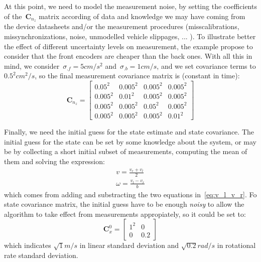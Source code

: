 At this point, we need to model the measurement noise, by setting the coefficients of the~$\mathbf{C}_{n_z}$ matrix according of data and knowledge we may have coming from the device datasheets and/or the measurement procedures (misscalibrations, missynchronizations, noise, unmodelled vehicle slippages, ... ). To illustrate better the effect of different uncertainty levels on measurement, the example propose to consider that the front encoders are cheaper than the back ones. With all this in mind, we consider~$\sigma_{.f}=5cm/s^2$ and~$\sigma_{.b}=1cm/s$, and we set covariance terms to $0.5^2 cm^2/s$, so the final measurement covariance matrix is (constant in time):
\begin{equation}
 \mathbf{C}_{n_z} = 
 \left[
 \begin{array}{cccc}
  0.05^2 & 0.005^2 & 0.005^2 & 0.005^2 \\
  0.005^2& 0.01^2  & 0.005^2 & 0.005^2 \\
  0.005^2& 0.005^2 & 0.05^2  & 0.005^2 \\
  0.005^2& 0.005^2 & 0.005^2 & 0.01^2
 \end{array}
 \right]
\end{equation}

Finally, we need the initial guess for the state estimate and state covariance. The initial guess for the state can be set by some knowledge about the system, or may be by collecting a short initial subset of measurements, computing the mean of them and solving the expression:
\begin{equation}
\begin{array}{cc}
 v = \frac{v_r+v_l}{2} \\
 \omega = \frac{v_l-v_r}{b}
\end{array}
\end{equation}
which comes from adding and substracting the two equations in~\ref{eq:v_l_v_r}. Fo state covariance matrix, the initial guess have to be enough \textit{noisy} to allow the algorithm to take effect from measurements appropiately, so it could be set to: 
\begin{equation}
 \mathbf{C}^0_{x} = 
 \left[
 \begin{array}{cc}
  1^2 & 0 \\
  0 & 0.2
  \end{array}
 \right]
\end{equation}
which indicates $\sqrt{1}m/s$ in linear standard deviation and $\sqrt{0.2}rad/s$ in rotational rate standard deviation. 

